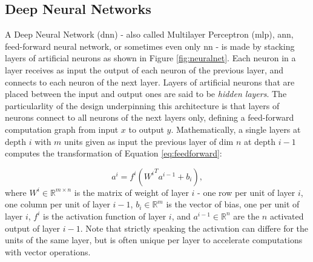 \subsection{Deep Neural Networks}
A Deep Neural Network (\gls{dnn}) - also called Multilayer Perceptron (\gls{mlp}), \gls{ann}, feed-forward neural network, or sometimes even only \gls{nn} - is made by stacking layers of artificial neurons as shown in Figure \ref{fig:neuralnet}. Each neuron in a layer receives as input the output of each neuron of the previous layer, and connects to each neuron of the next layer. Layers of artificial neurons that are placed between the input and output ones are said to be \textit{hidden layers}. The particularlity of the design underpinning this architecture is that layers of neurons connect to all neurons of the next layers only, defining a feed-forward computation graph from input $x$ to output $y$. Mathematically, a single layers at depth $i$ with $m$ units given as input the previous layer of dim $n$ at depth $i-1$ computes the  transformation of Equation \ref{eq:feedforward}:

\begin{equation}\label{eq:feedforward}
    a^i = f^i\left({W^i}^T a^{i-1} + b_i\right),
\end{equation}
where $W^i \in \mathbb{R}^{m \times n}$ is the matrix of weight of layer $i$ - one row per unit of layer $i$, one column per unit of layer $i-1$, $b_i \in \mathbb{R}^m$ is the vector of bias, one per unit of layer $i$, $f^i$ is the activation function of layer $i$, and $a^{i-1} \in \mathbb{R}^n$ are the $n$ activated output of layer $i-1$. Note that strictly speaking the activation can differe for the units of the same layer, but is often unique per layer to accelerate computations with vector operations.


